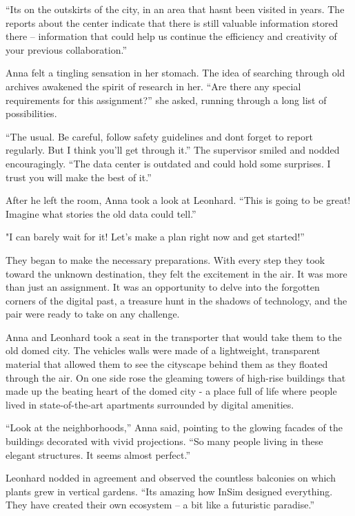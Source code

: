 \documentclass[
]{article}
\begin{document}
``It\textquotesingle s on the outskirts of the city, in an area that
hasn\textquotesingle t been visited in years. The reports about the
center indicate that there is still valuable information stored there --
information that could help us continue the efficiency and creativity of
your previous collaboration.''

Anna felt a tingling sensation in her stomach. The idea of
\hspace{0pt}\hspace{0pt}searching through old archives awakened the
spirit of research in her. ``Are there any special requirements for this
assignment?'' she asked, running through a long list of possibilities.

``The usual. Be careful, follow safety guidelines and
don\textquotesingle t forget to report regularly. But I think you'll get
through it.'' The supervisor smiled and nodded encouragingly. ``The data
center is outdated and could hold some surprises. I trust you will make
the best of it.''

After he left the room, Anna took a look at Leonhard. ``This is going to
be great! Imagine what stories the old data could tell.''

"I can barely wait for it! Let's make a plan right now and get
started!''

They began to make the necessary preparations. With every step they took
toward the unknown destination, they felt the excitement in the air. It
was more than just an assignment. It was an opportunity to delve into
the forgotten corners of the digital past, a treasure hunt in the
shadows of technology, and the pair were ready to take on any challenge.

Anna and Leonhard took a seat in the transporter that would take them to
the old domed city. The vehicle\textquotesingle s walls were made of a
lightweight, transparent material that allowed them to see the cityscape
behind them as they floated through the air. On one side rose the
gleaming towers of high-rise buildings that made up the beating heart of
the domed city - a place full of life where people lived in
state-of-the-art apartments surrounded by digital amenities.

``Look at the neighborhoods,'' Anna said, pointing to the glowing
facades of the buildings decorated with vivid projections. ``So many
people living in these elegant structures. It seems almost perfect.''

Leonhard nodded in agreement and observed the countless balconies on
which plants grew in vertical gardens. ``It\textquotesingle s amazing
how InSim designed everything. They have created their own ecosystem --
a bit like a futuristic paradise.''
\end{document}
